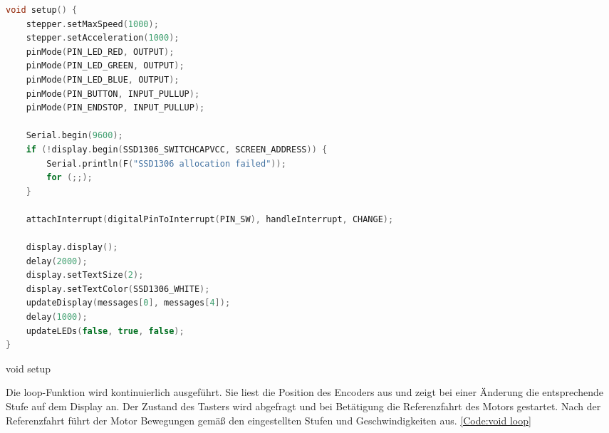\begin{code}
	\begin{lstlisting}[language=c++]
void setup() {
	stepper.setMaxSpeed(1000);
	stepper.setAcceleration(1000);
	pinMode(PIN_LED_RED, OUTPUT);
	pinMode(PIN_LED_GREEN, OUTPUT);
	pinMode(PIN_LED_BLUE, OUTPUT);
	pinMode(PIN_BUTTON, INPUT_PULLUP);
	pinMode(PIN_ENDSTOP, INPUT_PULLUP);
	
	Serial.begin(9600);
	if (!display.begin(SSD1306_SWITCHCAPVCC, SCREEN_ADDRESS)) {
		Serial.println(F("SSD1306 allocation failed"));
		for (;;);
	}
	
	attachInterrupt(digitalPinToInterrupt(PIN_SW), handleInterrupt, CHANGE);
	
	display.display();
	delay(2000);
	display.setTextSize(2);
	display.setTextColor(SSD1306_WHITE);
	updateDisplay(messages[0], messages[4]);
	delay(1000);
	updateLEDs(false, true, false);
}
\end{lstlisting}      

\caption[void setup]{void setup}\label{Code:void setup}    
\end{code} 

Die loop-Funktion wird kontinuierlich ausgeführt. Sie liest die Position des Encoders aus und zeigt bei einer Änderung die entsprechende Stufe auf dem Display an. Der Zustand des Tasters wird abgefragt und bei Betätigung die Referenzfahrt des Motors gestartet. Nach der Referenzfahrt führt der Motor Bewegungen gemäß den eingestellten Stufen und Geschwindigkeiten aus. \ref{Code:void loop}

